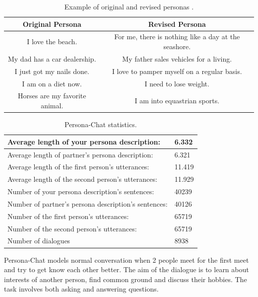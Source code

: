 \begin{table}[t]
\centering
  \begin{tabular}{ |c|c| } 
   \hline\hline
   \textbf{Original Persona} & \textbf{Revised Persona}  \\ 
   \hline\hline
   I love the beach. & For me, there is nothing like a day at the seashore. \\ 
   My dad has a car dealership. & My father sales vehicles for a living.  \\
   I just got my nails done. & I love to pamper myself on a regular basis. \\
   I am on a diet now. & I need to lose weight. \\
   Horses are my favorite animal. & I am into equastrian sports. \\ 
   \hline
  \end{tabular}
  \caption{Example of original and revised personas \cite{zhang2018personalizing}.}
\label{tab:persona_revised}
\end{table}

\begin{table}[t]
\centering
  \begin{tabular}{|p{8cm}|p{2cm}|} 
  \hline
  Average length of  your persona description: & 6.332 \\
  \hline
  Average length of partner's persona description: & 6.321 \\
  \hline
  Average length of the first person's utterances: & 11.419 \\
  \hline
  Average length of the second person's utterances: & 11.929 \\
  \hline
  Number of your persona description's sentences: & 40239 \\
  \hline
  Number of partner's  persona description's sentences: & 40126 \\
  \hline
  Number of the first person's utterances: & 65719 \\
  \hline
  Number of the second person's utterances:  & 65719 \\
  \hline
  Number of dialogues & 8938 \\
  \hline
  \end{tabular}
  \caption{Persona-Chat statistics.}
\label{tab:persona_chat_statistics}
\end{table}


Persona-Chat models normal conversation when 2 people meet for the first meet and try to get know each other better. The aim of the dialogue is to learn about interests of another person, find common ground and discuss their hobbies. The task involves both asking and answering questions. 

